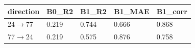\begin{tabular}{lllll}
\hline
direction & B0\_R2 & B1\_R2 & B1\_MAE & B1\_corr \\
\hline
24$\rightarrow$77 & 0.219 & 0.744 & 0.666 & 0.868 \\
77$\rightarrow$24 & 0.219 & 0.575 & 0.876 & 0.758 \\
\hline
\end{tabular}

